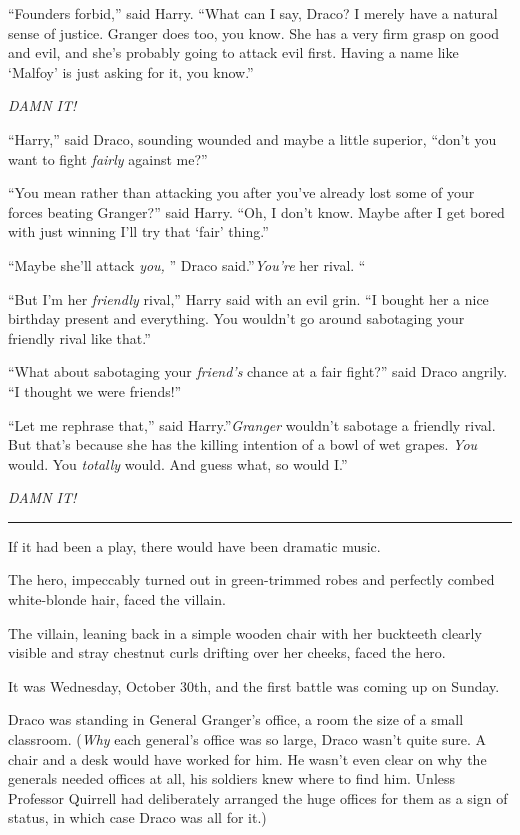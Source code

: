 ``Founders forbid,'' said Harry. ``What can I say, Draco? I merely have
a natural sense of justice. Granger does too, you know. She has a very
firm grasp on good and evil, and she's probably going to attack evil
first. Having a name like `Malfoy' is just asking for it, you know.''

\emph{DAMN IT!}

``Harry,'' said Draco, sounding wounded and maybe a little superior,
``don't you want to fight \emph{fairly} against me?''

``You mean rather than attacking you after you've already lost some of
your forces beating Granger?'' said Harry. ``Oh, I don't know. Maybe
after I get bored with just winning I'll try that `fair' thing.''

``Maybe she'll attack \emph{you,} '' Draco said.''\emph{You're} her rival.
``

``But I'm her \emph{friendly} rival,'' Harry said with an evil grin. ``I
bought her a nice birthday present and everything. You wouldn't go
around sabotaging your friendly rival like that.''

``What about sabotaging your \emph{friend's} chance at a fair fight?''
said Draco angrily. ``I thought we were friends!''

``Let me rephrase that,'' said Harry.''\emph{Granger} wouldn't sabotage
a friendly rival. But that's because she has the killing intention of a
bowl of wet grapes. \emph{You} would. You \emph{totally} would. And
guess what, so would I.''

\emph{DAMN IT!}

\begin{center}\rule{3in}{0.4pt}\end{center}

If it had been a play, there would have been dramatic music.

The hero, impeccably turned out in green-trimmed robes and perfectly
combed white-blonde hair, faced the villain.

The villain, leaning back in a simple wooden chair with her buckteeth
clearly visible and stray chestnut curls drifting over her cheeks, faced
the hero.

It was Wednesday, October 30th, and the first battle was coming up on
Sunday.

Draco was standing in General Granger's office, a room the size of a
small classroom. (\emph{Why} each general's office was so large, Draco
wasn't quite sure. A chair and a desk would have worked for him. He
wasn't even clear on why the generals needed offices at all, his
soldiers knew where to find him. Unless Professor Quirrell had
deliberately arranged the huge offices for them as a sign of status, in
which case Draco was all for it.)

